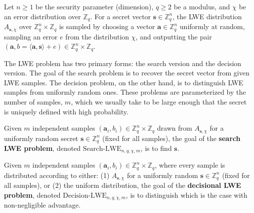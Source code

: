     \begin{definition}
        Let $n \ge 1$ be the security parameter (dimension), $q \ge 2$ be a modulus, and $\chi$ be an error distribution over $\mathbb{Z}_q$. For a secret vector $\mathbf{s} \in \mathbb{Z}_q^n$, the LWE distribution $A_{\mathbf{s}, \chi}$ over $\mathbb{Z}_q^n \times \mathbb{Z}_q$ is sampled by choosing a vector $\mathbf{a} \in \mathbb{Z}_q^n$ uniformly at random, sampling an error $e$ from the distribution $\chi$, and outputting the pair $(\mathbf{a}, b = \langle \mathbf{a}, \mathbf{s} \rangle + e) \in \mathbb{Z}_q^n \times \mathbb{Z}_q$.
    \end{definition}
    \noindent The LWE problem has two primary forms: the search version and the decision version. The goal of the search problem is to recover the secret vector from given LWE samples. The decision problem, on the other hand, is to distinguish LWE samples from uniformly random ones. These problems are parameterized by the number of samples, $m$, which we usually take to be large enough that the secret is uniquely defined with high probability.
    \begin{definition}
    Given $m$ independent samples $(\mathbf{a}_i, b_i) \in \mathbb{Z}_q^n \times \mathbb{Z}_q$ drawn from $A_{\mathbf{s},\chi}$ for a uniformly random secret $\mathbf{s} \in \mathbb{Z}_q^n$ (fixed for all samples), the goal of the \textbf{search LWE problem}, denoted $\text{Search-LWE}_{n,q,\chi,m}$, is to find $\mathbf{s}$.
    \end{definition}

        \begin{definition}
    Given $m$ independent samples $(\mathbf{a}_i, b_i) \in \mathbb{Z}_q^n \times \mathbb{Z}_q$, where every sample is distributed according to either: (1) $A_{\mathbf{s},\chi}$ for a uniformly random $\mathbf{s} \in \mathbb{Z}_q^n$ (fixed for all samples), or (2) the uniform distribution, the goal of the \textbf{decisional LWE problem}, denoted $\text{Decision-LWE}_{n,q,\chi,m}$, is to distinguish which is the case with non-negligible advantage.
    \end{definition}

